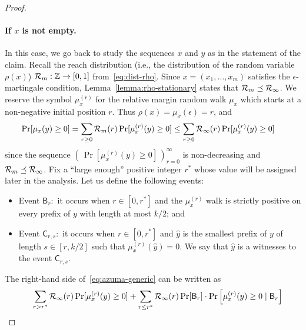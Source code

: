 \begin{proof}
\newcommand{\muxr}{\mu_x^{(r)}}
\newcommand{\Snr}{S_k^{(r)}}
\newcommand{\Sr}{S^{(r)}}
\newcommand{\Srstar}{S^{(r^*)}}
\newcommand{\event}[1]{\mathsf{#1}}
\newcommand{\notevent}[1]{\overline{\event{#1}}}

\paragraph{If $x$ is not empty.} 
In this case, we go back to study the sequences $x$ and $y$ as in the statement of the claim.
Recall the reach distribution (i.e., the distribution of the random variable $\rho(x)$) 
$\mathcal{R}_m : \mathbb{Z} \rightarrow [0,1]$ from~\eqref{eq:dist-rho}. 
Since $x = (x_1, \ldots, x_m)$ satisfies the $\epsilon$-martingale condition, 
Lemma~\ref{lemma:rho-stationary} states that $\mathcal{R}_m \preceq \mathcal{R}_\infty$.
We reserve the symbol $\muxr$ for the relative margin 
random walk $\mu_x$ which starts at a non-negative initial position $r$. 
Thus $\rho(x) = \mu_x(\epsilon) = r$, and
\begin{align}\label{eq:azuma-generic}
\Pr[\mu_x(y) \geq 0] 
&= \sum_{r \geq 0}{\DistRho_m(r) \Pr[\muxr(y) \geq 0]} 
\leq \sum_{r \geq 0}{\StationaryRho(r) \Pr[\muxr(y) \geq 0]} 
\, 
\end{align}
since the sequence $( \, \Pr[\muxr(y) \geq 0] \, )_{r=0}^\infty$ is non-decreasing and $\mathcal{R}_m \preceq \mathcal{R}_\infty$. Fix a ``large enough'' positive integer $r^*$ whose value will be assigned later in the analysis. 
Let us define the following events:
 \begin{itemize}
  \item Event $\event{B}_r$:~it occurs when $r \in [0, r^*]$ and the $\muxr$ walk is strictly positive on every prefix of $y$ with length at most $k/2$; and 
  \item Event $\event{C}_{r,s}$:~it occurs when $r \in [0, r^*]$ and 
  $\hat{y}$ is the smallest prefix of $y$ of length $s \in [r, k/2]$ 
  such that $\muxr(\hat{y}) = 0$. 
  We say that $\hat{y}$ is a witnesses to the event $\event{C}_{r, s}$.
\end{itemize}
The right-hand side of~\eqref{eq:azuma-generic} can be written as
\begin{align*}
     &\quad \sum_{r>r^*}{\StationaryRho(r) \Pr[\muxr(y) \geq 0]} 
		+ \sum_{r \leq r^*}{\StationaryRho(r) \Pr[\event{B}_r] \cdot \Pr\left[\muxr(y) \geq 0 \mid \event{B}_r\right]} \\

\end{align*}
\end{proof}
